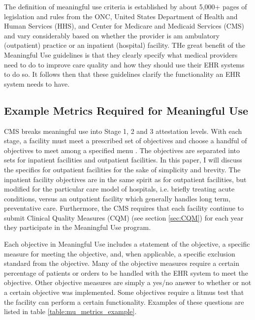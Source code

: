 \documentclass[10pt]{article}
\begin{document}
The definition of meaningful use criteria is established by about 5,000+ pages of legislation and rules from the ONC, United States Department of Health and Human Services (HHS), and Center for Medicare and Medicaid Services (CMS) and vary considerably based on whether the provider is am ambulatory (outpatient) practice or an inpatient (hospital) facility.
THe great benefit of the Meaningful Use guidelines is that they clearly specify what medical providers need to do to improve care quality and how they should use their EHR systems to do so.
It follows then that these guidelines clarify the functionality an EHR system needs to have.

\subsection{Example Metrics Required for Meaningful Use}
\label{sec:Meaningful Use Metrics}

CMS breaks meaningful use into Stage 1, 2 and 3 attestation levels.
With each stage, a facility must meet a prescribed set of objectives and choose a handful of objectives to meet among a specified menu \cite{cms-stage1}.
The objectives are separated into sets for inpatient facilities and outpatient facilities.
In this paper, I will discuss the specifics for outpatient facilities for the sake of simplicity and brevity.
The inpatient facility objectives are in the same spirit as for outpatient facilities, but modified for the particular care model of hospitals, i.e. briefly treating acute conditions, versus an outpatient facility which generally handles long term, preventative care.
Furthermore, the CMS requires that each facility continue to submit Clinical Quality Measures (CQM) (see section \ref{sec:CQM}) for each year they participate in the Meaningful Use program.

Each objective in Meaningful Use includes a statement of the objective, a specific measure for meeting the objective, and, when applicable, a specific exclusion standard from the objective.
Many of the objective measures require a certain percentage of patients or orders to be handled with the EHR system to meet the objective.
Other objective measures are simply a yes/no answer to whether or not a certain objective was implemented.
Some objectives require a litmus test that the facility can perform a certain functionality. Examples of these questions are listed in table \ref{table:mu_metrics_example}.
\end{document}
